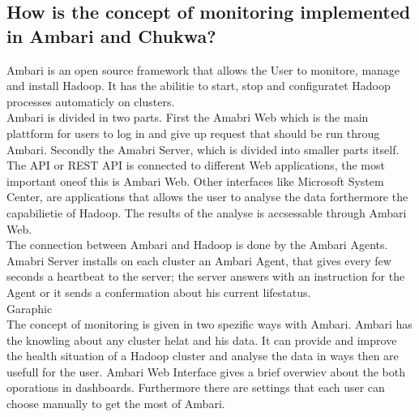 \subsection{How is the concept of monitoring implemented in Ambari and Chukwa?}
Ambari is an open source framework that allows the User to monitore, manage and install Hadoop. It has the abilitie to start, stop and configuratet Hadoop processes automaticly on clusters. 
\\
Ambari is divided in two parts. First the Amabri Web which is the main plattform for users to log in and give up request that should be run throug Ambari. Secondly the Amabri Server, which is divided into smaller parts itself. The API or REST API is connected to different Web applications, the most important oneof this is Ambari Web. Other interfaces like Microsoft System Center, are applications that allows the user to analyse the data forthermore the capabilietie of Hadoop. The results of the analyse is accsessable through Ambari Web.
\\
The connection between Ambari and Hadoop is done by the Ambari Agents. Amabri Server installs on each cluster an Ambari Agent, that gives every few seconds a heartbeat to the server; the server answers with an instruction for the Agent or it sends a confermation about his current lifestatus. 
\\
Garaphic 
\\ 
The concept of monitoring is given in two spezific ways with Ambari. Ambari has the knowling about any cluster helat and his data. It can provide and improve the health situation of a Hadoop cluster and analyse the data in ways then are usefull for the user. Ambari Web Interface gives a brief overwiev about the both oporations in dashboards. Furthermore there are settings that each user can choose manually to get the most of Ambari.